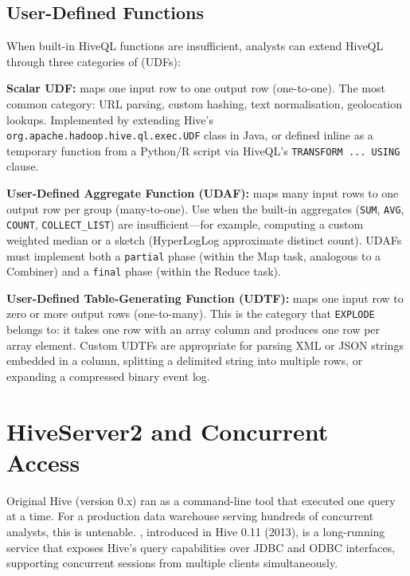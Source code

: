 \subsection{User-Defined Functions}
\label{subsec:udfs}

When built-in HiveQL functions are insufficient, analysts can extend
HiveQL through three categories of  (UDFs):

\textbf{Scalar UDF:} maps one input row to one output row (one-to-one).
The most common category: URL parsing, custom hashing, text normalisation,
geolocation lookups. Implemented by extending Hive's
\texttt{org.apache.hadoop.hive.ql.exec.UDF} class in Java, or defined
inline as a temporary function from a Python/R script via HiveQL's
\texttt{TRANSFORM ... USING} clause.

\textbf{User-Defined Aggregate Function (UDAF):} maps many input rows to
one output row per group (many-to-one). Use when the built-in aggregates
(\texttt{SUM}, \texttt{AVG}, \texttt{COUNT}, \texttt{COLLECT\_LIST}) are
insufficient---for example, computing a custom weighted median or a sketch
(HyperLogLog approximate distinct count). UDAFs must implement both a
\texttt{partial} phase (within the Map task, analogous to a Combiner)
and a \texttt{final} phase (within the Reduce task).

\textbf{User-Defined Table-Generating Function (UDTF):} maps one input
row to zero or more output rows (one-to-many). This is the category that
\texttt{EXPLODE} belongs to: it takes one row with an array column and
produces one row per array element. Custom UDTFs are appropriate for
parsing XML or JSON strings embedded in a column, splitting a delimited
string into multiple rows, or expanding a compressed binary event log.

\section{HiveServer2 and Concurrent Access}
\label{sec:hiveserver2}

Original Hive (version 0.x) ran as a command-line tool that executed
one query at a time. For a production data warehouse serving hundreds of
concurrent analysts, this is untenable. , introduced
in Hive 0.11 (2013), is a long-running service that exposes Hive's query
capabilities over JDBC and ODBC interfaces, supporting concurrent sessions
from multiple clients simultaneously.

